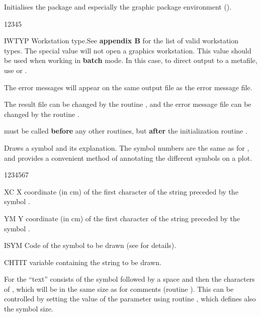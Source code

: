 \Action
Initialises the \HPLOT{} package and especially the graphic package environment
(\HIGZ{}).
\Pdesc
\begin{DLtt}{12345}
\item[IWTYP] Workstation type.See {\bf appendix B} for the list of valid
             workstation types. The special value  will not open a
             graphics workstation. This value should be used when working in
             {\bf batch} mode.  In this case, to direct output to
             a metafile, use  or .
\end{DLtt}
\Remarks
\begin{UL}
\item The \HPLOT{} error messages will appear on the same output file as the
      \HBOOK{} error message file.
\item The \HBOOK{} result file can be changed by the \HBOOK{} routine
      , and the \HBOOK{} error message file can be changed by the
      \HBOOK{} routine .
\item {} must be called {\bf before} any other \HPLOT{} routines, but
      {\bf after} the \HBOOK{} initialization routine .
\end{UL}


\Action
Draws a symbol and its explanation. The symbol numbers are the same as for 
, and  provides a convenient method of annotating the
different symbols on a plot.
\Pdesc
\begin{DLtt}{1234567}
\item[XC]    X coordinate (in cm) of the first character of the string preceded 
             by the symbol .
\item[YM]    Y coordinate (in cm) of the first character of the string preceded 
             by the symbol .
\item[ISYM]  Code of the symbol to be drawn (see  for details).
\item[CHTIT] \CHARACTER{} variable containing the string to be drawn.
\end{DLtt}
\Remark
For  the ``text'' consists of the symbol followed by a space and 
then the characters of , which will be in the same size as for 
comments (routine ). This can be controlled by setting the value of
the parameter  using routine , which defines also the 
symbol size.


